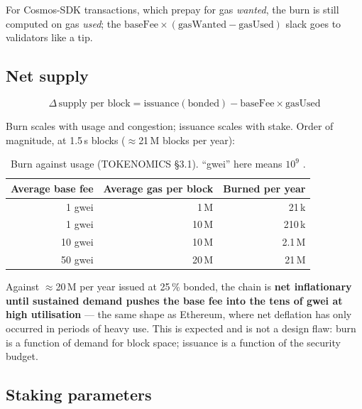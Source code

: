 For Cosmos-SDK transactions, which prepay for gas \emph{wanted}, the burn is still
computed on gas \emph{used}; the $\text{baseFee} \times (\text{gasWanted} -
\text{gasUsed})$ slack goes to validators like a tip.

\subsection{Net supply}
\label{sec:netsupply}

\begin{equation}
\Delta\,\text{supply per block} = \text{issuance}(\text{bonded}) - \text{baseFee} \times \text{gasUsed}
\end{equation}

Burn scales with usage and congestion; issuance scales with stake. Order of
magnitude, at 1.5\,s blocks ($\approx$21\,M blocks per year):

\begin{table}[H]
\centering
\small
\begin{tabular}{@{}rrr@{}}
\toprule
Average base fee & Average gas per block & Burned per year \\
\midrule
1 gwei & 1\,M & 21\,k \kash{} \\
1 gwei & 10\,M & 210\,k \kash{} \\
10 gwei & 10\,M & 2.1\,M \kash{} \\
50 gwei & 20\,M & 21\,M \kash{} \\
\bottomrule
\end{tabular}
\caption{Burn against usage (TOKENOMICS \S3.1). ``gwei'' here means
$10^{9}$ \esp{}.}
\end{table}

Against $\approx$20\,M \kash{} per year issued at 25\,\% bonded, the chain is
\textbf{net inflationary until sustained demand pushes the base fee into the
tens of gwei at high utilisation} --- the same shape as Ethereum, where net
deflation has only occurred in periods of heavy use. This is expected and is
not a design flaw: burn is a function of demand for block space; issuance is
a function of the security budget.

\subsection{Staking parameters}
\label{sec:staking}

